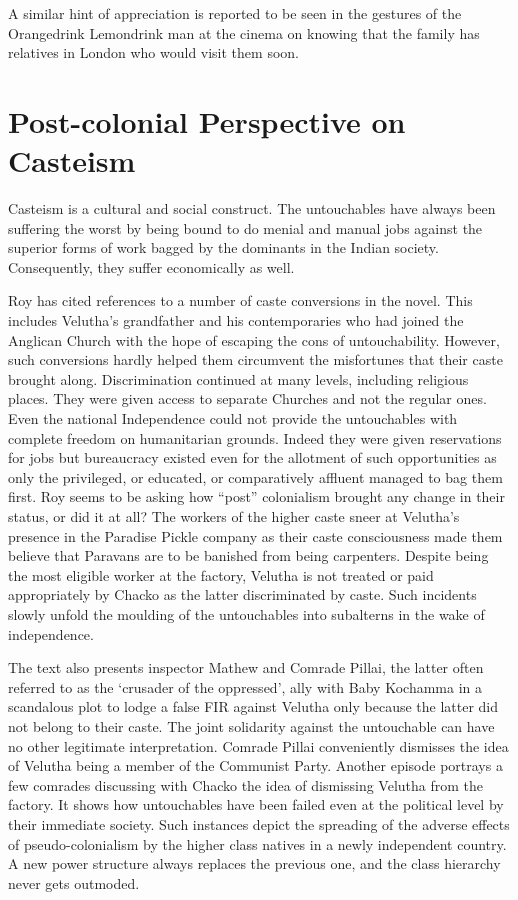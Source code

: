 A similar hint of appreciation is reported to be seen in the gestures of the Orangedrink Lemondrink man at the cinema on knowing that the family has relatives in London who would visit them soon. 

\section{Post-colonial Perspective on Casteism}

Casteism is a cultural and social construct. The untouchables have always been suffering the worst by being bound to do menial and manual jobs against the superior forms of work bagged by the dominants in the Indian society. Consequently, they suffer economically as well.

Roy has cited references to a number of caste conversions in the novel. This includes Velutha's grandfather and his contemporaries who had \linebreak joined the Anglican Church with the hope of escaping the cons of untouchability. However, such conversions hardly helped them circumvent the misfortunes that their caste brought along. Discrimination continued at many levels, including religious places. They were given access to separate Churches and not the regular ones. Even the national Independence could not provide the untouchables with complete freedom on humanitarian grounds. Indeed they were given reservations for jobs but bureaucracy existed even for the allotment of such opportunities as only the privileged, or educated, or comparatively affluent managed to bag them first. Roy seems to be asking how ``post'' colonialism brought any change in their status, or did it at all? The workers of the higher caste sneer at Velutha's presence in the Paradise Pickle company as their caste consciousness made them believe that Paravans are to be banished from being carpenters. Despite being the most eligible worker at the factory, Velutha is not treated or paid appropriately by Chacko as the latter discriminated by caste. Such incidents slowly unfold the moulding of the untouchables into subalterns in the wake of independence. 

The text also presents inspector Mathew and Comrade Pillai, the latter often referred to as the `crusader of the oppressed', ally with Baby Kochamma in a scandalous plot to lodge a false FIR against Velutha only because the latter did not belong to their caste. The joint solidarity against the untouchable can have no other legitimate interpretation. Comrade Pillai conveniently dismisses the idea of Velutha being a member of the Communist Party. Another episode portrays a few comrades discussing with Chacko the idea of dismissing Velutha from the factory. It shows how untouchables have been failed even at the political level by their immediate society. Such instances depict the spreading of the adverse effects of pseudo-colonialism by the higher class natives in a newly independent country. A new power structure always replaces the previous one, and the class hierarchy never gets outmoded.

